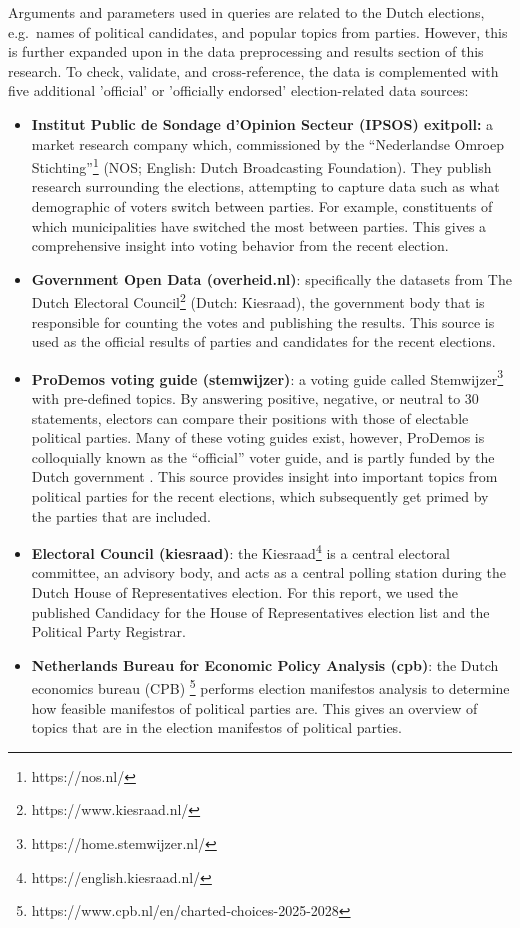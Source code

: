 Arguments and parameters used in queries are related to the Dutch elections, e.g.\ names of political candidates, and popular topics from parties.
However, this is further expanded upon in the data preprocessing and results section of this research.
To check, validate, and cross-reference, the data is complemented with five additional 'official' or 'officially endorsed' election-related data sources: 
\begin{itemize}
  \item \textbf{Institut Public de Sondage d'Opinion Secteur (IPSOS) exitpoll:} a market research company which, commissioned by the “Nederlandse Omroep Stichting”\footnote{https://nos.nl/} (NOS; English: Dutch Broadcasting Foundation).
  They publish research surrounding the elections, attempting to capture data such as what demographic of voters switch between parties.
  For example, constituents of which municipalities have switched the most between parties\cite{nos}. 
  This gives a comprehensive insight into voting behavior from the recent election.
  \item \textbf{Government Open Data (overheid.nl)}: specifically the datasets from The Dutch Electoral Council\footnote{https://www.kiesraad.nl/} (Dutch: Kiesraad), the government body that is responsible for counting the votes and publishing the results\cite{kiesraad}.
  This source is used as the official results of parties and candidates for the recent elections.
  \item \textbf{ProDemos voting guide (stemwijzer)}: a voting guide called Stemwijzer\footnote{https://home.stemwijzer.nl/} with pre-defined topics.
  By answering positive, negative, or neutral to 30 statements, electors can compare their positions with those of electable political parties.
  Many of these voting guides exist, however, ProDemos is colloquially known as the “official” voter guide, and is partly funded by the Dutch government \cite{prodemos}. 
  This source provides insight into important topics from political parties for the recent elections, which subsequently get primed by the parties that are included.
  \item \textbf{Electoral Council (kiesraad)}: the Kiesraad\footnote{https://english.kiesraad.nl/} is a central electoral committee, an advisory body, and acts as a central polling station during the Dutch House of Representatives election.
  For this report, we used the published Candidacy for the House of Representatives election list and the Political Party Registrar.
  \item \textbf{Netherlands Bureau for Economic Policy Analysis (cpb)}: the Dutch economics bureau (CPB) \footnote{https://www.cpb.nl/en/charted-choices-2025-2028} performs election manifestos analysis to determine how feasible manifestos of political parties are.
  This gives an overview of topics that are in the election manifestos of political parties.
\end{itemize}

